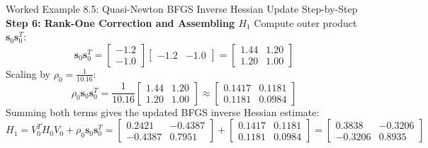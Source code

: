 \begin{examplebox}[breakable]{Worked Example 8.5: Quasi-Newton BFGS Inverse Hessian Update Step-by-Step}
\textbf{Step 6: Rank-One Correction and Assembling $H_1$}
Compute outer product $\mathbf{s}_0 \mathbf{s}_0^T$:
\begin{equation*}
\mathbf{s}_0 \mathbf{s}_0^T = \begin{bmatrix} -1.2 \\ -1.0 \end{bmatrix} \begin{bmatrix} -1.2 & -1.0 \end{bmatrix} = \begin{bmatrix} 1.44 & 1.20 \\ 1.20 & 1.00 \end{bmatrix}
\end{equation*}
Scaling by $\rho_0 = \frac{1}{10.16}$:
\begin{equation*}
\rho_0 \mathbf{s}_0 \mathbf{s}_0^T = \frac{1}{10.16} \begin{bmatrix} 1.44 & 1.20 \\ 1.20 & 1.00 \end{bmatrix} \approx \mathbf{\begin{bmatrix} 0.1417 & 0.1181 \\ 0.1181 & 0.0984 \end{bmatrix}}
\end{equation*}
Summing both terms gives the updated BFGS inverse Hessian estimate:
\begin{equation*}
H_1 = V_0^T H_0 V_0 + \rho_0 \mathbf{s}_0 \mathbf{s}_0^T = \begin{bmatrix} 0.2421 & -0.4387 \\ -0.4387 & 0.7951 \end{bmatrix} + \begin{bmatrix} 0.1417 & 0.1181 \\ 0.1181 & 0.0984 \end{bmatrix} = \mathbf{\begin{bmatrix} 0.3838 & -0.3206 \\ -0.3206 & 0.8935 \end{bmatrix}}
\end{equation*}


\end{examplebox}

